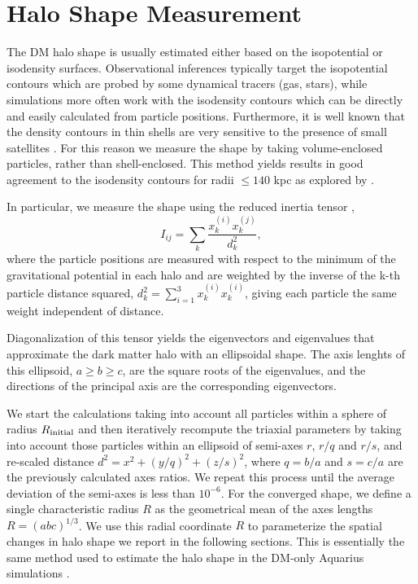 \documentclass[usenatbib]{mnras}
\begin{document}
\section{Halo Shape Measurement}
\label{sec:method}

The DM halo shape is usually estimated either based on the isopotential or
isodensity surfaces.   
Observational inferences typically target the 
isopotential contours which are probed by some dynamical tracers (gas, stars), while
simulations more often work with the isodensity contours which can be directly and easily
calculated from particle positions.  
Furthermore, it is well known that the density contours in thin shells are very sensitive to
the presence of small satellites \citep{Springel2004}.  
For this reason we measure the shape by taking
volume-enclosed particles, rather than shell-enclosed.  
This method yields results in good agreement to the isodensity
contours for radii $\leq 140$ kpc as explored by
\citet{VeraCiro11}.  


In particular, we measure the shape using the reduced inertia tensor
\citep{Allgood06},  
\begin{equation}
I_{ij} = \sum_k \frac{x_k^{(i)}x_k^{(j)}}{d^2_k},
\label{eq:inertia}
\end{equation}
where the particle positions are measured with respect to the minimum of the
gravitational potential in each halo and are weighted by the inverse of 
the k-th particle distance squared, $d_k^2 = \sum_{i=1}^3 x_k^{(i)} x_k^{(i)}$, giving each particle the same
weight independent of distance.

Diagonalization of this tensor yields the eigenvectors and
eigenvalues that approximate the dark matter halo with an ellipsoidal shape.
The axis lenghts of this ellipsoid, $a\geq b \geq c$, are the square
roots of the  eigenvalues, and the directions of the principal
axis are the corresponding eigenvectors. 

We start the calculations taking into account all particles within a
sphere of radius $R_{\rm initial}$ and then iteratively recompute the
triaxial parameters by taking into account those particles within an ellipsoid of semi-axes
$r$, $r/q$ and $r/s$, and re-scaled distance $d^2=x^2+(y/q)^2+(z/s)^2$, where $q
= b/a$ and $s=c/a$ are the previously calculated axes ratios. 
We repeat this process until the average deviation of the semi-axes is
less than $10^{-6}$. For the converged shape, we define a single characteristic radius $R$ 
as the geometrical mean of the axes lengths $R=(abc)^{1/3}$.
We use this radial coordinate $R$ to parameterize the spatial changes
in halo shape we report in the following sections.
This is essentially the same method used to estimate the halo shape in the DM-only
Aquarius simulations \citep{VeraCiro11}. 
\end{document}
